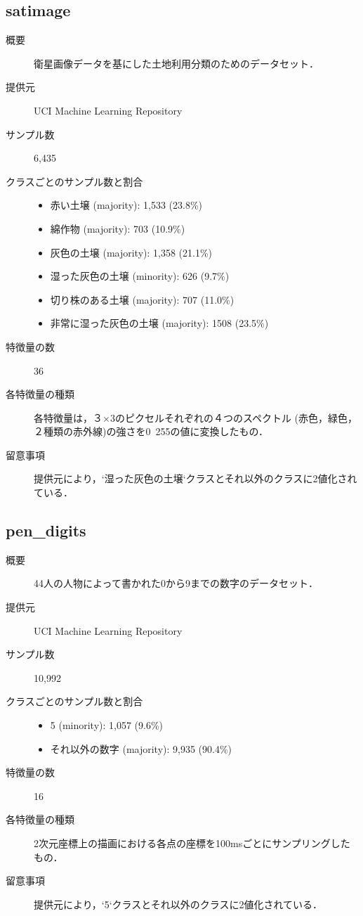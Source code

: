     \subsection{satimage}
    \begin{description}
        \item[概要] 衛星画像データを基にした土地利用分類のためのデータセット．\cite{satimage}
        \item[提供元] UCI Machine Learning Repository
        \item[サンプル数] 6,435
        \item[クラスごとのサンプル数と割合] \mbox{}
            \begin{itemize}
                \item 赤い土壌 (majority): 1,533 (23.8\%)
                \item 綿作物 (majority): 703 (10.9\%)
                \item 灰色の土壌 (majority): 1,358 (21.1\%)
                \item 湿った灰色の土壌 (minority): 626 (9.7\%)
                \item 切り株のある土壌 (majority): 707 (11.0\%)
                \item 非常に湿った灰色の土壌 (majority): 1508 (23.5\%)
            \end{itemize}
        \item[特徴量の数] 36
        \item[各特徴量の種類] \mbox{}
            各特徴量は，３$\times$3のピクセルそれぞれの４つのスペクトル (赤色，緑色，２種類の赤外線)の強さを0~255の値に変換したもの．
        \item[留意事項]  提供元により，`湿った灰色の土壌`クラスとそれ以外のクラスに2値化されている．
    \end{description}

\subsection{pen\_digits}
\begin{description}
    \item[概要] 44人の人物によって書かれた0から9までの数字のデータセット．\cite{pen_digits}
    \item[提供元] UCI Machine Learning Repository
    \item[サンプル数] 10,992
    \item[クラスごとのサンプル数と割合] \mbox{}
        \begin{itemize}
            \item 5 (minority): 1,057 (9.6\%)
            \item それ以外の数字 (majority): 9,935 (90.4\%) %
        \end{itemize}
    \item[特徴量の数] 16
    \item[各特徴量の種類] \mbox{}
        2次元座標上の描画における各点の座標を100msごとにサンプリングしたもの．
    \item[留意事項]  提供元により，`5`クラスとそれ以外のクラスに2値化されている．
\end{description}


